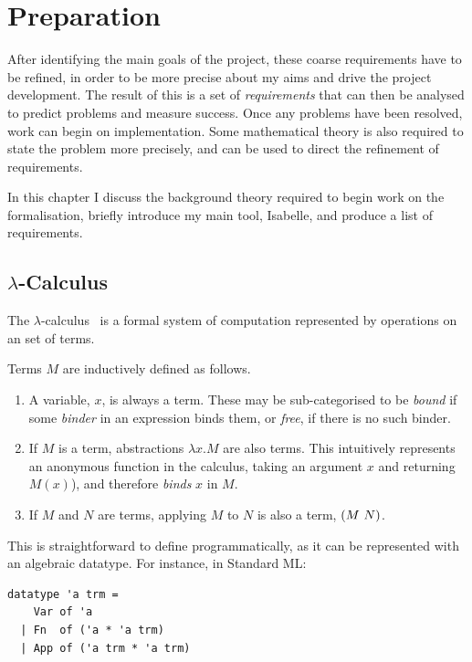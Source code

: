 \chapter{Preparation}
\label{chap:preparation}
After identifying the main goals of the project, these coarse requirements have to be refined, in order to be more precise about my aims and drive the project development.
The result of this is a set of \emph{requirements} that can then be analysed to predict problems and measure success.
Once any problems have been resolved, work can begin on implementation.
Some mathematical theory is also required to state the problem more precisely, and can be used to direct the refinement of requirements.

In this chapter I discuss the background theory required to begin work on the formalisation, briefly introduce my main tool, Isabelle, and produce a list of requirements.

\section{\(\lambda\)-Calculus}
\label{sec:lambda-intro}
The \(\lambda\)-calculus~\cite{lambda-overview} is a formal system of computation represented by operations on an set of terms.
\begin{definition}
Terms \(M\) are inductively defined as follows.
\begin{enumerate}
\item
A variable, \(x\), is always a term.
These may be sub-categorised to be \emph{bound} if some \emph{binder} in an expression binds them, or \emph{free}, if there is no such binder.
\item
If \(M\) is a term, abstractions \(\lambda x.M\) are also terms.
This intuitively represents an anonymous function in the calculus, taking an argument \(x\) and returning \(M(x)\)), and therefore \emph{binds} \(x\) in \(M\).
\item
If \(M\) and \(N\) are terms, applying \(M\) to \(N\) is also a term, \(\left(M\ N\right)\).
\end{enumerate}
\end{definition}

This is straightforward to define programmatically, as it can be represented with an algebraic datatype.
For instance, in Standard ML:
\begin{verbatim}
datatype 'a trm =
    Var of 'a
  | Fn  of ('a * 'a trm)
  | App of ('a trm * 'a trm)
\end{verbatim}


